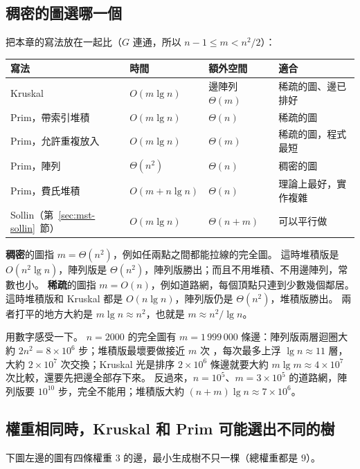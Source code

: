 \subsection{稠密的圖選哪一個}

把本章的寫法放在一起比（$G$ 連通，所以 $n - 1 \le m < n^2/2$）：

\begin{center}
\small
\begin{tabular}{llll}
\toprule
寫法 & 時間 & 額外空間 & 適合 \\
\midrule
Kruskal & $O(m \lg n)$ & 邊陣列 $\Theta(m)$ & 稀疏的圖、邊已排好 \\
Prim，帶索引堆積 & $O(m \lg n)$ & $\Theta(n)$ & 稀疏的圖 \\
Prim，允許重複放入 & $O(m \lg n)$ & $\Theta(m)$ & 稀疏的圖，程式最短 \\
Prim，陣列 & $\Theta(n^2)$ & $\Theta(n)$ & 稠密的圖 \\
Prim，費氏堆積 & $O(m + n \lg n)$ & $\Theta(n)$ & 理論上最好，實作複雜 \\
Sollin（第~\ref{sec:mst-sollin}~節） & $O(m \lg n)$ & $\Theta(n + m)$ & 可以平行做 \\
\bottomrule
\end{tabular}
\end{center}

\textbf{稠密}的圖指 $m = \Theta(n^2)$，例如任兩點之間都能拉線的完全圖。 這時堆積版是
$O(n^2 \lg n)$，陣列版是 $\Theta(n^2)$，陣列版勝出；而且不用堆積、不用邊陣列，常數也小。
\textbf{稀疏}的圖指 $m = O(n)$，例如道路網，每個頂點只連到少數幾個鄰居。 這時堆積版和
Kruskal 都是 $O(n \lg n)$，陣列版仍是 $\Theta(n^2)$，堆積版勝出。 兩者打平的地方大約是 $m
\lg n \approx n^2$，也就是 $m \approx n^2 / \lg n$。

用數字感受一下。 $n = 2000$ 的完全圖有 $m = 1\,999\,000$ 條邊：陣列版兩層迴圈大約 $2n^2 =
8 \times 10^6$ 步；堆積版最壞要做接近 $m$ 次 ，每次最多上浮 $\lg n
\approx 11$ 層，大約 $2 \times 10^7$ 次交換；Kruskal 光是排序 $2 \times 10^6$ 條邊就要大約
$m \lg m \approx 4 \times 10^7$ 次比較，還要先把邊全部存下來。 反過來，$n = 10^5$、$m = 3
\times 10^5$ 的道路網，陣列版要 $10^{10}$ 步，完全不能用；堆積版大約 $(n + m) \lg n \approx
7 \times 10^6$。

\subsection{權重相同時，Kruskal 和 Prim 可能選出不同的樹}

下圖左邊的圖有四條權重 $3$ 的邊，最小生成樹不只一棵（總權重都是 $9$）。

